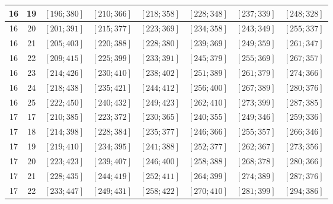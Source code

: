 \documentclass[a4paper,12pt]{article}
\begin{document}
\begin{center}
{\begin{longtable}[H]{|c|c|c|c|c|c|c|c|}
16 &  19 &  $\left[ 196; 380\right]$ &  $\left[ 210; 366\right]$ &  $\left[ 218; 358\right]$ &  $\left[ 228; 348\right]$ &  $\left[ 237; 339\right]$ &  $\left[ 248; 328\right]$ \tabularnewline \hline
16 &  20 &  $\left[ 201; 391\right]$ &  $\left[ 215; 377\right]$ &  $\left[ 223; 369\right]$ &  $\left[ 234; 358\right]$ &  $\left[ 243; 349\right]$ &  $\left[ 255; 337\right]$ \tabularnewline \hline
16 &  21 &  $\left[ 205; 403\right]$ &  $\left[ 220; 388\right]$ &  $\left[ 228; 380\right]$ &  $\left[ 239; 369\right]$ &  $\left[ 249; 359\right]$ &  $\left[ 261; 347\right]$ \tabularnewline \hline
16 &  22 &  $\left[ 209; 415\right]$ &  $\left[ 225; 399\right]$ &  $\left[ 233; 391\right]$ &  $\left[ 245; 379\right]$ &  $\left[ 255; 369\right]$ &  $\left[ 267; 357\right]$ \tabularnewline \hline
16 &  23 &  $\left[ 214; 426\right]$ &  $\left[ 230; 410\right]$ &  $\left[ 238; 402\right]$ &  $\left[ 251; 389\right]$ &  $\left[ 261; 379\right]$ &  $\left[ 274; 366\right]$ \tabularnewline \hline
16 &  24 &  $\left[ 218; 438\right]$ &  $\left[ 235; 421\right]$ &  $\left[ 244; 412\right]$ &  $\left[ 256; 400\right]$ &  $\left[ 267; 389\right]$ &  $\left[ 280; 376\right]$ \tabularnewline \hline
16 &  25 &  $\left[ 222; 450\right]$ &  $\left[ 240; 432\right]$ &  $\left[ 249; 423\right]$ &  $\left[ 262; 410\right]$ &  $\left[ 273; 399\right]$ &  $\left[ 287; 385\right]$ \tabularnewline \hline
17 &  17 &  $\left[ 210; 385\right]$ &  $\left[ 223; 372\right]$ &  $\left[ 230; 365\right]$ &  $\left[ 240; 355\right]$ &  $\left[ 249; 346\right]$ &  $\left[ 259; 336\right]$ \tabularnewline \hline
17 &  18 &  $\left[ 214; 398\right]$ &  $\left[ 228; 384\right]$ &  $\left[ 235; 377\right]$ &  $\left[ 246; 366\right]$ &  $\left[ 255; 357\right]$ &  $\left[ 266; 346\right]$ \tabularnewline \hline
17 &  19 &  $\left[ 219; 410\right]$ &  $\left[ 234; 395\right]$ &  $\left[ 241; 388\right]$ &  $\left[ 252; 377\right]$ &  $\left[ 262; 367\right]$ &  $\left[ 273; 356\right]$ \tabularnewline \hline
17 &  20 &  $\left[ 223; 423\right]$ &  $\left[ 239; 407\right]$ &  $\left[ 246; 400\right]$ &  $\left[ 258; 388\right]$ &  $\left[ 268; 378\right]$ &  $\left[ 280; 366\right]$ \tabularnewline \hline
17 &  21 &  $\left[ 228; 435\right]$ &  $\left[ 244; 419\right]$ &  $\left[ 252; 411\right]$ &  $\left[ 264; 399\right]$ &  $\left[ 274; 389\right]$ &  $\left[ 287; 376\right]$ \tabularnewline \hline
17 &  22 &  $\left[ 233; 447\right]$ &  $\left[ 249; 431\right]$ &  $\left[ 258; 422\right]$ &  $\left[ 270; 410\right]$ &  $\left[ 281; 399\right]$ &  $\left[ 294; 386\right]$ \tabularnewline \hline

\end{longtable}}
\end{center}
\end{document}
